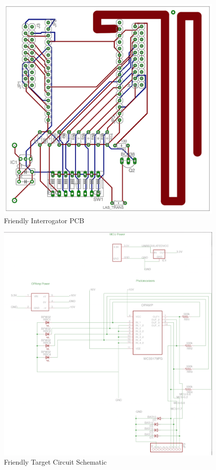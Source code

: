 \documentclass[letterpaper,10pt]{article}
\begin{document}
\begin{spacing}{1.15}
\begin{figure} [H]
	\centering
	\includegraphics[scale=0.37]{interrogator_pcb.png}
	\caption{Friendly Interrogator PCB\label{fig:interrogator-pcb}}
\end{figure}

\begin{figure} [H]
	\centering
	\includegraphics[scale=0.70]{target-schematic.png}
	\caption{Friendly Target Circuit Schematic \label{fig:target-schematic}}
\end{figure}


\end{spacing}
\end{document}
